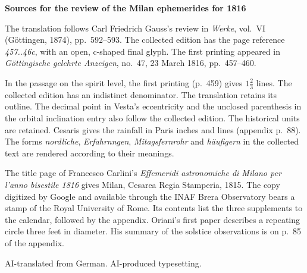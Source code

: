 \clearpage\thispagestyle{empty}
\begin{center}\Large\bfseries Sources for the review of the Milan ephemerides for 1816\end{center}

The translation follows Carl Friedrich Gauss’s review in \emph{Werke}, vol.~VI (Göttingen, 1874), pp.~592--593. The collected edition has the page reference \emph{457..46c}, with an open, c-shaped final glyph. The first printing appeared in \emph{Göttingische gelehrte Anzeigen}, no.~47, 23 March 1816, pp.~457--460.

In the passage on the spirit level, the first printing (p.~459) gives $1\frac{2}{3}$ lines. The collected edition has an indistinct denominator. The translation retains its outline. The decimal point in Vesta’s eccentricity and the unclosed parenthesis in the orbital inclination entry also follow the collected edition. The historical units are retained. Cesaris gives the rainfall in Paris inches and lines (appendix p.~88). The forms \emph{nordliche}, \emph{Erfahrnngen}, \emph{Mitagsfernrohr} and \emph{häufigern} in the collected text are rendered according to their meanings.

The title page of Francesco Carlini’s \emph{Effemeridi astronomiche di Milano per l’anno bisestile 1816} gives Milan, Cesarea Regia Stamperia, 1815. The copy digitized by Google and available through the INAF Brera Observatory bears a stamp of the Royal University of Rome. Its contents list the three supplements to the calendar, followed by the appendix. Oriani’s first paper describes a repeating circle three feet in diameter. His summary of the solstice observations is on p.~85 of the appendix.

AI-translated from German. AI-produced typesetting.

